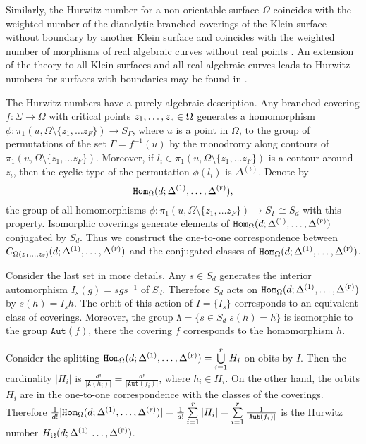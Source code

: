 \documentclass[a4paper,10pt]{article}
\theoremstyle{plain}
\theoremstyle{remark}
\begin{document}
Similarly, the Hurwitz number for a non-orientable surface $\Omega$ coincides with the weighted number of the dianalytic
branched coverings of the Klein surface without boundary by another Klein surface and coincides with the weighted number
of morphisms of real algebraic curves without real points \cite{AG,N90,N2004}. An extension of the theory to all Klein surfaces
and all real algebraic curves leads to Hurwitz numbers for surfaces
with boundaries may be found in \cite{AN,N}.

\vspace{2ex}

The Hurwitz numbers have a purely algebraic description.  Any branched covering $f:\Sigma\rightarrow\Omega$ with
critical points $z_1,\dots,z_\textsc{f}\in\Omega$ generates a homomorphism $
\phi: \pi_1(u,\Omega\setminus\{z_1,\dots z_F\})\rightarrow S_{\Gamma}$,
where $u$ is a point in $\Omega$,
to the group of permutations of the set $\Gamma=f^{-1}(u)$ by the monodromy along contours of
$\pi_1(u,\Omega\setminus\{z_1,\dots z_F\})$.  Moreover, if $l_i\in\pi_1(u,\Omega\setminus\{z_1,\dots z_F\})$ is a contour
around $z_i$, then the cyclic type of the permutation $\phi(l_i)$ is $\Delta^{(i)}$. Denote by
$$\texttt{Hom}_\Omega(d;\Delta^{(1)},\dots,\Delta^{(\textsc{f})}),$$
the group of all homomorphisms $\phi: \pi_1(u,\Omega\setminus\{z_1,\dots z_F\})\rightarrow S_{\Gamma}\cong S_d$ with this
property. Isomorphic coverings generate elements of $
\texttt{Hom}_\Omega(d;\Delta^{(1)},\dots,\Delta^{(\textsc{f})})$ conjugated by $S_d$. Thus
we construct the one-to-one correspondence between $
C_{\Omega (z_1\dots,z_{\textsc{f}})} (d;\Delta^{(1)},\dots,\Delta^{(\textsc{f})})$ and the conjugated classes
of $\texttt{Hom}_\Omega(d;\Delta^{(1)},\dots,\Delta^{(\textsc{f})})$.

\vspace{1ex}

Consider the last set in more details. Any $s\in S_d$ generates the interior automorphism $I_s(g)=sgs^{-1}$ of $S_d$. Therefore
$S_d$ acts on $\texttt{Hom}_\Omega(d;\Delta^{(1)},\dots,\Delta^{(\textsc{f})})$ by $s(h)=I_s h$. The orbit of this action of
$I=\{I_s\}$ corresponds to an equivalent class of coverings. Moreover, the group $\texttt{A}= \{s\in S_d|s(h)=h\}$ is
 isomorphic to the group
$\texttt{Aut}(f)$, there the covering $f$ corresponds to the homomorphism $h$.

Consider the splitting
$\texttt{Hom}_\Omega(d;\Delta^{(1)},\dots,\Delta^{(\textsc{f})})= \bigcup\limits_{i=1}^rH_i$ on obits by $I$. Then the
cardinality $|H_i|$ is $\frac{d!}{|\texttt{A}(h_i)|}= \frac{d!}{|\texttt{Aut}(f_i)|}$, where $h_i\in H_i$. On the other
hand, the orbits $H_i$ are in the one-to-one correspondence with the classes of the coverings.
Therefore $\frac{1}{d!}|\texttt{Hom}_\Omega(d;\Delta^{(1)}, \dots,\Delta^{(\textsc{f})})| =
\frac{1}{d!}\sum\limits_{i=1}^r |H_i|= \sum\limits_{i=1}^r \frac{1}{|\texttt{Aut}(f_i)|}$ is the
Hurwitz number $H_\Omega(d; \Delta^{(1)}\,\dots,\Delta^{(\textsc{f})})$.
\end{document}
